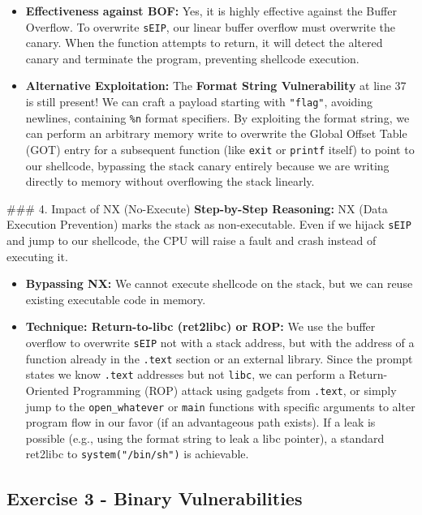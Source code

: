 \documentclass{article}
\begin{document}
\begin{itemize}
    \item \textbf{Effectiveness against BOF:} Yes, it is highly effective against the Buffer Overflow. To overwrite \texttt{sEIP}, our linear buffer overflow must overwrite the canary. When the function attempts to return, it will detect the altered canary and terminate the program, preventing shellcode execution.
    \item \textbf{Alternative Exploitation:} The \textbf{Format String Vulnerability} at line 37 is still present! We can craft a payload starting with \texttt{"flag"}, avoiding newlines, containing \texttt{\%n} format specifiers. By exploiting the format string, we can perform an arbitrary memory write to overwrite the Global Offset Table (GOT) entry for a subsequent function (like \texttt{exit} or \texttt{printf} itself) to point to our shellcode, bypassing the stack canary entirely because we are writing directly to memory without overflowing the stack linearly.

\end{itemize}
\#\#\# 4. Impact of NX (No-Execute)
\textbf{Step-by-Step Reasoning:}
NX (Data Execution Prevention) marks the stack as non-executable. Even if we hijack \texttt{sEIP} and jump to our shellcode, the CPU will raise a fault and crash instead of executing it.
\begin{itemize}
    \item \textbf{Bypassing NX:} We cannot execute shellcode on the stack, but we can reuse existing executable code in memory.
    \item \textbf{Technique: Return-to-libc (ret2libc) or ROP:} We use the buffer overflow to overwrite \texttt{sEIP} not with a stack address, but with the address of a function already in the \texttt{.text} section or an external library. Since the prompt states we know \texttt{.text} addresses but not \texttt{libc}, we can perform a Return-Oriented Programming (ROP) attack using gadgets from \texttt{.text}, or simply jump to the \texttt{open\_whatever} or \texttt{main} functions with specific arguments to alter program flow in our favor (if an advantageous path exists). If a leak is possible (e.g., using the format string to leak a libc pointer), a standard ret2libc to \texttt{system("/bin/sh")} is achievable.
\end{itemize}

\subsection{Exercise 3 - Binary Vulnerabilities}
\end{document}
